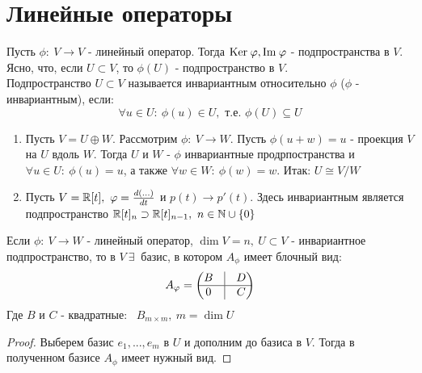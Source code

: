 \section{Линейные операторы}
    \begin{definition}
        Пусть $\phi: \ V \to V$ - линейный оператор. Тогда $\text{Ker} \hspace{0.09cm} \phi, \text{Im} \hspace{0.09cm} \phi$ - подпространства в $V$. Ясно, что, если $U \subset V$, то $\phi(U)$ - подпространство в $V$.\\
        Подпространство $U \subset V$ называется инвариантным относительно $\phi$ ($\phi$ - инвариантным), если: 
        $$\forall u \in U: \ \phi(u) \in U, \text{ т.е. }\phi(U) \subseteq U$$   
    \end{definition}
    \begin{example}\tab
        \begin{enumerate}
            \item Пусть $V = U \oplus W$. Рассмотрим $\phi: \ V \to W$. Пусть $\phi(u + w) = u$ - проекция $V$ на $U$ вдоль $W$. Тогда $U$ и $W$ - $\phi$ инвариантные продрпостранства и $\forall u \in U: \ \phi(u) = u$, а также $\forall w \in W: \ \phi(w) = w$. Итак: $U \cong V/W$
            \item Пусть $V = \R[t], \ \phi = \frac{d(...)}{dt}$ и $p(t) \to p'(t)$. Здесь инвариантным является подпространство $\R[t]_n \supset \R[t]_{n-1}, \ n \in \N \cup \{0\}$               
        \end{enumerate}
    \end{example}
    \begin{theorem}
        Если $\phi: \ V \to W$ - линейный оператор, $\dim V = n, \ U \subset V$ - инвариантное подпространство, то в $V \ \exists \ $ базис, в котором $A_\phi$ имеет блочный вид: 
        $$A_\phi = \begin{pmatrix}
            B & \vline & D \\ \hline 0 & \vline & C
        \end{pmatrix}$$
        Где $B$ и $C$ - квадратные: \ $B_{m \times m}, \ m = \dim U$   
    \end{theorem}
    \begin{proof}
        Выберем базис $e_1,...,e_m$ в $U$ и дополним до базиса в $V$. Тогда в полученном базисе $A_\phi$ имеет нужный вид. 
    \end{proof}
